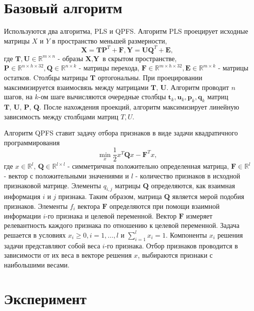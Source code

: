 \documentclass[12pt,twoside]{article}
\begin{document}
\section{Базовый алгоритм}

Используются два алгоритма, PLS и QPFS. 
Алгоритм PLS проецирует исходные матрицы $X$ и $Y$ в пространство меньшей размерности, $$\textbf{X} = \textbf{TP}^T + \textbf{F}, \textbf{Y} = \textbf{UQ}^T + \textbf{E} ,$$ где $\textbf{T}, \textbf{U} \in \mathbb{R}^{m \times n}$ 
- образы $\textbf{X}, \textbf{Y}$ в скрытом пространстве, 
$\textbf{P} \in \mathbb{R}^{n \times h \times 32}, \textbf{Q} \in \mathbb{R}^{n \times k}$ - матрицы перехода, 
$\textbf{F} \in \mathbb{R}^{m \times h \times 32}, \textbf{E} \in \mathbb{R}^{m \times k}$ - матрицы остатков. Cтолбцы матрицы $\textbf{T}$ ортогональны. При проецировании максимизируется взаимосвязь между матрицами $\textbf{T, U}$. Алгоритм проводит $n$ шагов, на $k$-ом шаге вычисляются очередные столбцы $\textbf{t}_k,\textbf{u}_k,\textbf{p}_k,\textbf{q}_k$ матриц $\textbf{T, U, P, Q}.$
После нахождения проекций, алгоритм максимизирует линейную зависимость между столбцами матриц $T, U.$

Алгоритм QPFS ставит задачу отбора признаков в виде задачи квадратичного программирования $$\min_x \frac1{2} x^T \textbf{Q}x- \textbf{F}^Tx ,$$
где $x \in \mathbb{R}^l$, $\textbf{Q} \in \mathbb{R}^{l \times l}$ - симметричная положительно определенная матрица, $\textbf{F} \in \mathbb{R}^l$ - вектор с положительными значениями и $l$ - количество признаков в исходной признаковой матрице. Элементы $q_{i,j}$ матрицы $\textbf{Q}$ определяются, как взаимная информация $i$ и $j$ признака. Таким образом, матрица $\textbf{Q}$ является мерой подобия признаков. Элементы $f_i$ вектора $\textbf{F}$ определяются при помощи взаимной информации $i$-го признака и целевой переменной. Вектор $\textbf{F}$ измеряет релевантность каждого признака по отношению к целевой переменной. Задача решается в условиях $x_i \geq 0, i = 1, \dots, l$ и $\sum\limits^l_{i=1} x_i = 1$. Компоненты $x_i$ решения задачи представляют собой веса $i$-го признака. Отбор признаков проводится в зависимости от их веса в векторе решения $x$, выбираются признаки с наибольшими весами.

\section{Эксперимент}
\end{document}
